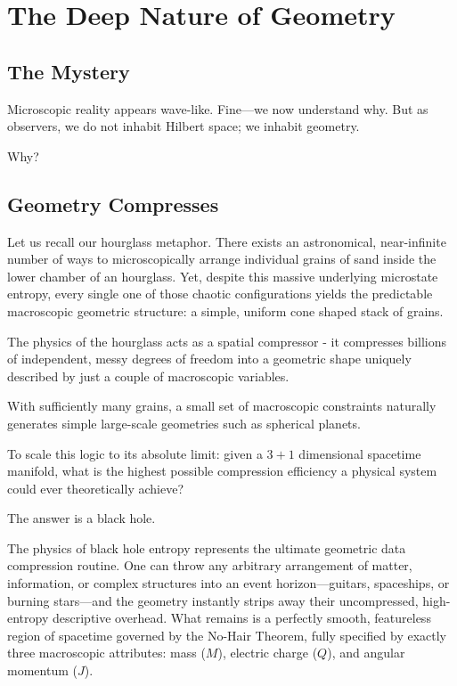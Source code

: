 \chapter{The Deep Nature of Geometry}
\label{chap:the-nature-of-geometry}

\section{The Mystery}

Microscopic reality appears wave-like. Fine—we now understand why. But as observers, we do not inhabit Hilbert space; we inhabit geometry.

Why?


\section{Geometry Compresses}

Let us recall our hourglass metaphor. There exists an astronomical, near-infinite number of ways to microscopically arrange individual grains of sand inside the lower chamber of an hourglass.
Yet, despite this massive underlying microstate entropy, every single one of those chaotic configurations yields the predictable macroscopic geometric structure: a simple, uniform cone shaped stack of grains. 

The physics of the hourglass acts as a spatial compressor - it compresses billions of independent, messy degrees of freedom into a geometric shape uniquely described by just a couple of macroscopic variables.

With sufficiently many grains, a small set of macroscopic constraints naturally generates simple large-scale geometries such as spherical planets.

To scale this logic to its absolute limit: given a $3+1$ dimensional spacetime manifold, what is the highest possible compression efficiency a physical system could ever theoretically achieve?

The answer is a black hole.

The physics of black hole entropy represents the ultimate geometric data compression routine.
One can throw any arbitrary arrangement of matter, information, or complex structures into an event horizon—guitars, spaceships, or burning stars—and the geometry instantly strips away their uncompressed, high-entropy descriptive overhead.
What remains is a perfectly smooth, featureless region of spacetime governed by the No-Hair Theorem, fully specified by exactly three macroscopic attributes: mass ($M$), electric charge ($Q$), and angular momentum ($J$). 

